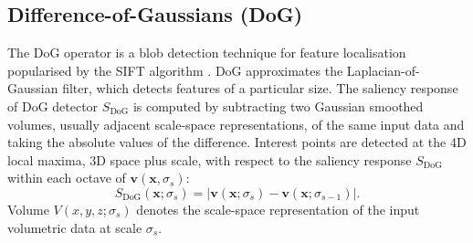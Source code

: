 \subsection{Difference-of-Gaussians (DoG)}
The DoG operator is a blob detection technique for feature localisation popularised by the SIFT algorithm \cite{Lowe2004}. DoG approximates the Laplacian-of-Gaussian filter, which detects features of a particular size. 
The saliency response of DoG detector $S_{\textrm{DoG}}$ is computed by subtracting two Gaussian smoothed volumes, usually adjacent scale-space representations, of the same input data and taking the absolute values of the difference.
Interest points are detected at the 4D local maxima, \ie 3D space plus scale, with respect to the saliency response $S_{\textrm{DoG}}$ within each octave of $\mathbf{v}(\mathbf{x},\sigma_s)$: 
\begin{equation}
	\label{eqn/eval/dog} 
	S_{\textrm{DoG}}(\mathbf{x};\sigma_s) = \bigg|\mathbf{v}(\mathbf{x};\sigma_s) - \mathbf{v}(\mathbf{x};\sigma_{s-1})\bigg|.
\end{equation}
Volume $V(x,y,z;\sigma_s)$ denotes the scale-space representation of the input volumetric data at scale $\sigma_s$.


